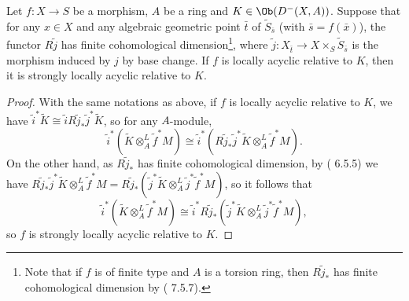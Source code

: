 \begin{proposition}\label{scheme morphsim locally acyclic imply strongly if}
Let $f:X\to S$ be a morphism, $A$ be a ring and $K\in\Ob(D^-(X,A))$. Suppose that for any $x\in X$ and any algebraic geometric point $\bar{t}$ of $\widetilde{S}_{\bar{s}}$ (with $\bar{s}=f(\bar{x})$), the functor $R\tilde{j}$ has finite cohomological dimension\footnote{Note that if $f$ is of finite type and $A$ is a torsion ring, then $R\tilde{j}_*$ has finite cohomological dimension by (\cite{Fulei} 7.5.7).}, where $\tilde{j}:X_{\bar{t}}\to X\times_S\widetilde{S}_{\bar{s}}$ is the morphism induced by $j$ by base change. If $f$ is locally acyclic relative to $K$, then it is strongly locally acyclic relative to $K$.
\end{proposition}
\begin{proof}
With the same notations as above, if $f$ is locally acyclic relative to $K$, we have $\tilde{i}^*\widetilde{K}\cong\tilde{i}R\tilde{j}_*\tilde{j}^*\widetilde{K}$, so for any $A$-module, 
\[\tilde{i}^*(\widetilde{K}\otimes_A^L\tilde{f}^*M)\cong\tilde{i}^*(R\tilde{j}_*\tilde{j}^*\widetilde{K}\otimes_A^L\tilde{f}^*M).\]
On the other hand, as $R\tilde{j}_*$ has finite cohomological dimension, by (\cite{Fulei} 6.5.5) we have $R\tilde{j}_*\tilde{j}^*\widetilde{K}\otimes_A^L\tilde{f}^*M=R\tilde{j}_*(\tilde{j}^*\widetilde{K}\otimes_A^L\tilde{j}^*\tilde{f}^*M)$, so it follows that
\[\tilde{i}^*(\widetilde{K}\otimes_A^L\tilde{f}^*M)\cong\tilde{i}^*R\tilde{j}_*(\tilde{j}^*\widetilde{K}\otimes_A^L\tilde{j}^*\tilde{f}^*M),\]
so $f$ is strongly locally acyclic relative to $K$.
\end{proof}

